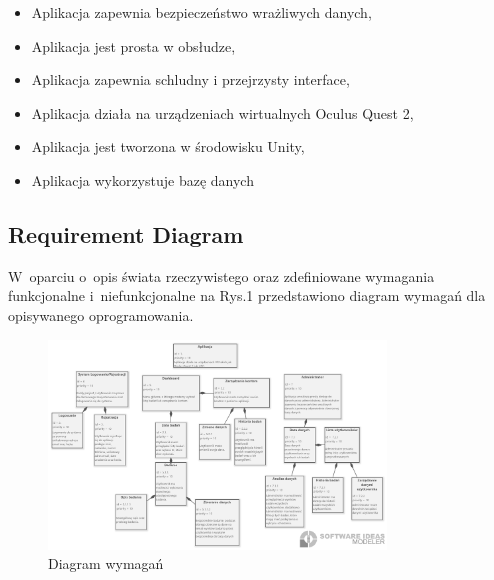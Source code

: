 \documentclass[12pt, letterpaper]{article}
\begin{document}
		
			\begin{itemize}
				\item Aplikacja zapewnia bezpieczeństwo wrażliwych danych,
				\item Aplikacja jest prosta w obsłudze,
				\item Aplikacja zapewnia schludny i przejrzysty interface,
				\item Aplikacja działa na urządzeniach wirtualnych Oculus Quest 2,
				\item Aplikacja jest tworzona w środowisku Unity,
				\item Aplikacja wykorzystuje bazę danych
			\end{itemize}
			
			
		\subsection{Requirement Diagram}
		
		W~oparciu o~opis świata rzeczywistego oraz zdefiniowane wymagania funkcjonalne i~niefunkcjonalne na Rys.1 przedstawiono diagram wymagań dla opisywanego oprogramowania.
		
\begin{figure}[h]
  \centering
      \includegraphics[width=0.8\textwidth]{reqDiagram}
  \caption{Diagram wymagań}
\end{figure}
		
		
\newpage
		
\end{document}
